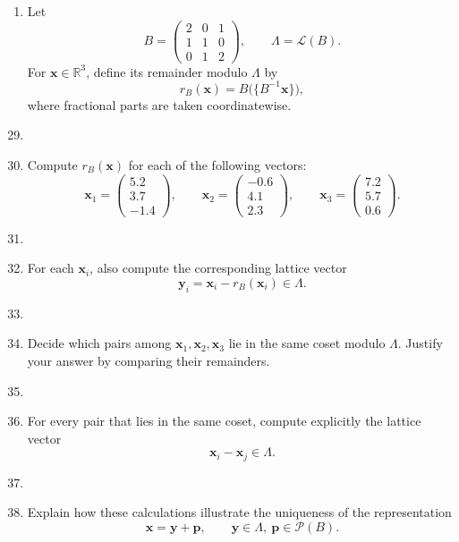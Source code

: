 \newpage
\begin{enumerate}
	\item[\textbf{29-33}] Let
	\[
	B=
	\begin{pmatrix}
		2&0&1\\
		1&1&0\\
		0&1&2
	\end{pmatrix},
	\qquad
	\Lambda=\mathcal L(B).
	\]
	For \(\mathbf x\in\mathbb R^3\), define its remainder modulo \(\Lambda\) by
	\[
	r_B(\mathbf x)=B\bigl(\{B^{-1}\mathbf x\}\bigr),
	\]
	where fractional parts are taken coordinatewise.
	
\end{enumerate}

\begin{enumerate}
	\setcounter{enumi}{28}
   \item[]\item Compute \(r_B(\mathbf x)\) for each of the following vectors:
\[
\mathbf x_1=
\begin{pmatrix}
	5.2\\
	3.7\\
	-1.4
\end{pmatrix},
\qquad
\mathbf x_2=
\begin{pmatrix}
	-0.6\\
	4.1\\
	2.3
\end{pmatrix},
\qquad
\mathbf x_3=
\begin{pmatrix}
	7.2\\
	5.7\\
	0.6
\end{pmatrix}.
\]
\item[]\item For each \(\mathbf x_i\), also compute the corresponding lattice vector
\[
\mathbf y_i=\mathbf x_i-r_B(\mathbf x_i)\in\Lambda.
\]
\item[]\item Decide which pairs among \(\mathbf x_1,\mathbf x_2,\mathbf x_3\) lie in the same coset modulo \(\Lambda\). Justify your answer by comparing their remainders.
\item[]\item For every pair that lies in the same coset, compute explicitly the lattice vector
\[
\mathbf x_i-\mathbf x_j\in\Lambda.
\]
\item[]\item Explain how these calculations illustrate the uniqueness of the representation
\[
\mathbf x=\mathbf y+\mathbf p,
\qquad
\mathbf y\in\Lambda,\ \mathbf p\in\mathcal P(B).
\]
\end{enumerate}

